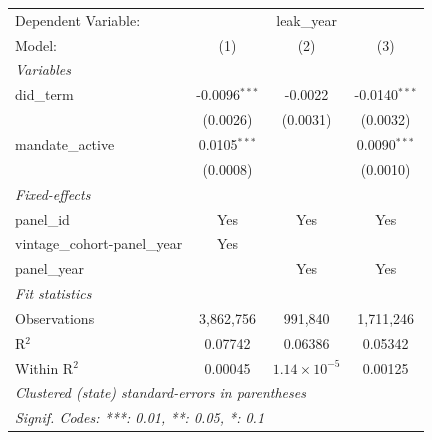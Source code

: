 
\begingroup
\centering
\begin{tabular}{lccc}
   \tabularnewline \midrule \midrule
   Dependent Variable: & \multicolumn{3}{c}{leak\_year}\\
   Model:                        & (1)             & (2)                   & (3)\\  
   \midrule
   \emph{Variables}\\
   did\_term                     & -0.0096$^{***}$ & -0.0022               & -0.0140$^{***}$\\   
                                 & (0.0026)        & (0.0031)              & (0.0032)\\   
   mandate\_active               & 0.0105$^{***}$  &                       & 0.0090$^{***}$\\   
                                 & (0.0008)        &                       & (0.0010)\\   
   \midrule
   \emph{Fixed-effects}\\
   panel\_id                     & Yes             & Yes                   & Yes\\  
   vintage\_cohort-panel\_year   & Yes             &                       & \\  
   panel\_year                   &                 & Yes                   & Yes\\  
   \midrule
   \emph{Fit statistics}\\
   Observations                  & 3,862,756       & 991,840               & 1,711,246\\  
   R$^2$                         & 0.07742         & 0.06386               & 0.05342\\  
   Within R$^2$                  & 0.00045         & $1.14\times 10^{-5}$  & 0.00125\\  
   \midrule \midrule
   \multicolumn{4}{l}{\emph{Clustered (state) standard-errors in parentheses}}\\
   \multicolumn{4}{l}{\emph{Signif. Codes: ***: 0.01, **: 0.05, *: 0.1}}\\
\end{tabular}
\par\endgroup


